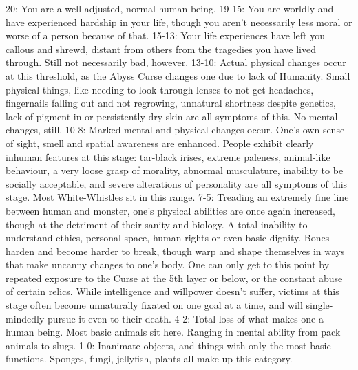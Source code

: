 20: You are a well-adjusted, normal human being.
 19-15: You are worldly and have experienced hardship in your life, though you aren’t necessarily less moral or worse of a person because of that. 
15-13: Your life experiences have left you callous and shrewd, distant from others from the tragedies you have lived through. Still not necessarily bad, however.
13-10: Actual physical changes occur at this threshold, as the Abyss Curse changes one due to lack of Humanity. Small physical things, like needing to look through lenses to not get headaches, fingernails falling out and not regrowing, unnatural shortness despite genetics, lack of pigment in or persistently dry skin are all symptoms of this. No mental changes, still.
10-8: Marked mental and physical changes occur. One’s own sense of sight, smell and spatial awareness are enhanced. People exhibit clearly inhuman features at this stage: tar-black irises, extreme paleness, animal-like behaviour, a very loose grasp of morality, abnormal musculature, inability to be socially acceptable, and severe alterations of personality are all symptoms of this stage. Most White-Whistles sit in this range.
7-5: Treading an extremely fine line between human and monster, one’s physical abilities are once again increased, though at the detriment of their sanity and biology. A total inability to understand ethics, personal space, human rights or even basic dignity. Bones harden and become harder to break, though warp and shape themselves in ways that make uncanny changes to one’s body. One can only get to this point by repeated exposure to the Curse at the 5th layer or below, or the constant abuse of certain relics. While intelligence and willpower doesn’t suffer, victims at this stage often become unnaturally fixated on one goal at a time, and will single-mindedly pursue it even to their death.
4-2: Total loss of what makes one a human being. Most basic animals sit here. Ranging in mental ability from pack animals to slugs.
1-0: Inanimate objects, and things with only the most basic functions. Sponges, fungi, jellyfish, plants all make up this category.

